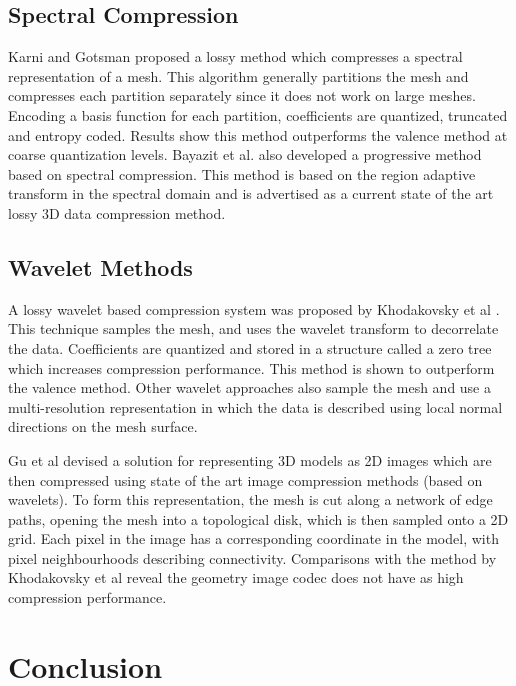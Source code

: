 \subsection{Spectral Compression}

Karni and Gotsman \cite{Karni00Spectral} proposed a lossy method which compresses a spectral representation of a mesh. This algorithm generally partitions the mesh and compresses each partition separately since it does not work on large meshes. Encoding a basis function for each partition, coefficients are quantized, truncated and entropy coded. Results show this method outperforms the valence method \cite{touma98triangle} at coarse quantization levels. Bayazit et al. \cite{Bayazit103DMesh} also developed a progressive method based on spectral compression. This method is based on the region adaptive transform in the spectral domain and is advertised as a current state of the art lossy 3D data compression method. \\

\subsection{Wavelet Methods}

A lossy wavelet based compression system was proposed by Khodakovsky et al \cite{Khodakovsky00Progressive}. This technique samples the mesh, and uses the wavelet transform to decorrelate the data. Coefficients are quantized and stored in a structure called a zero tree which increases compression performance. This method is shown to outperform the valence method. Other wavelet approaches \cite{Guskov00Normal,Khodakovsky04Normalmesh} also sample the mesh and use a multi-resolution representation in which the data is described using local normal directions on the mesh surface.

Gu et al \cite{Gu02Geometry} devised a solution for representing 3D models as 2D images which are then compressed using state of the art image compression methods (based on wavelets). To form this representation, the mesh is cut along a network of edge paths, opening the mesh into a topological disk, which is then sampled onto a 2D grid. Each pixel in the image has a corresponding coordinate in the model, with pixel neighbourhoods describing connectivity. Comparisons with the method by Khodakovsky et al reveal the geometry image codec does not have as high compression performance.






\section{Conclusion}

